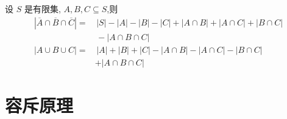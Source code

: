 \documentclass[punct]{ctexbeamer}
\begin{document}
\begin{frame}
    设 $S$ 是有限集, $A, B, C \subseteq S$,则
    \begin{align*}
        |\overline{A} \cap \overline{B} \cap \overline{C} | =
        &\, |S|-|A|-|B|-|C|+|A \cap B|+|A \cap C|+|B \cap C|\\
        &\,  -|A \cap B \cap C|  \\
        |A \cup B \cup C| = & \, |A|+|B|+|C|-|A \cap B|-|A \cap C|-|B \cap C|\\
        & +|A \cap B \cap C|
    \end{align*}



    \def\firstcircle{(0,0) circle (1cm)}
    \def\secondcircle{(0:1.5cm) circle (1cm)}
    \def\thirdcircle{(50:1.3cm) circle (1cm)}

    \begin{center}
    \end{center}

\end{frame}



\section{容斥原理}
\end{document}
